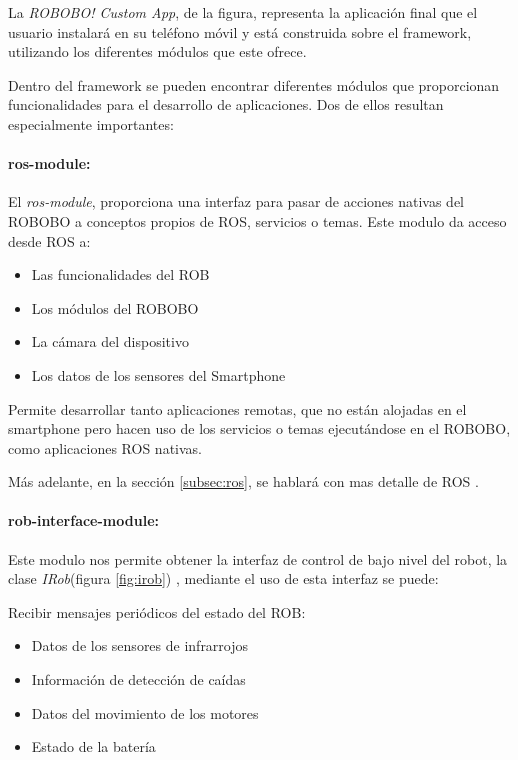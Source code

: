 La \textit{ROBOBO! Custom App}, de la figura, representa la aplicación final que el usuario instalará en su teléfono móvil y está construida sobre el framework, utilizando los diferentes módulos que este ofrece.



Dentro del framework se pueden encontrar diferentes módulos que proporcionan funcionalidades para el desarrollo de aplicaciones. Dos de ellos resultan especialmente importantes:

\paragraph*{ros-module:\\}
	 El \textit{ros-module}, proporciona una interfaz para pasar de acciones nativas del ROBOBO a conceptos propios de ROS, servicios o temas. Este modulo da acceso desde ROS a: 
	\begin{itemize}
		\item Las funcionalidades del ROB
		\item Los módulos del ROBOBO
		\item La cámara del dispositivo
		\item Los datos de los sensores del Smartphone
	\end{itemize} 
	Permite desarrollar tanto aplicaciones remotas, que no están alojadas en el smartphone pero  hacen uso de los servicios o temas ejecutándose en el ROBOBO, como aplicaciones ROS nativas.
	
Más adelante, en la sección \ref{subsec:ros}, se hablará con mas detalle de ROS .

\paragraph*{rob-interface-module:\\}
Este modulo nos permite obtener la interfaz de control de bajo nivel del robot, la clase \textit{IRob}(figura \ref{fig:irob}) , mediante el uso de esta interfaz se puede:

Recibir mensajes periódicos del estado del ROB:
\begin{itemize}
	\item Datos de los sensores de infrarrojos
	\item Información de detección de caídas
	\item Datos del movimiento de los motores
	\item Estado de la batería
\end{itemize}


